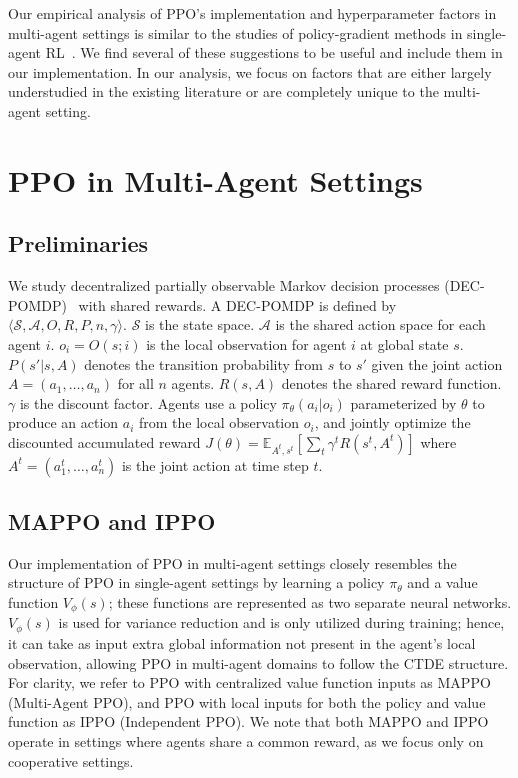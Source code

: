 \documentclass{article}
\theoremstyle{plain}
\theoremstyle{definition}
\theoremstyle{remark}
\begin{document}
Our empirical analysis of PPO's implementation and hyperparameter factors in multi-agent settings is similar to the studies of policy-gradient methods in single-agent RL~\cite{tucker2018mirage, Ilyas2020A, Engstrom2020Implementation, andrychowicz2021what}. We find several of these suggestions to be useful and include them in our implementation. In our analysis, we focus on factors that are either largely understudied in the existing literature or are completely unique to the multi-agent setting. 


 \section{PPO in Multi-Agent Settings} 
 \vspace{-2mm}
\subsection{Preliminaries}
We study decentralized partially observable Markov decision processes (DEC-POMDP)~\cite{oliehoek2016concise} with shared rewards. A DEC-POMDP is defined by $\langle \mathcal{S}, \mathcal{A}, O, R, P, n, \gamma \rangle$. $\mathcal{S}$ is the state space. $\mathcal{A}$ is the shared action space for  each agent $i$. $o_i=O(s;i)$ is the local observation for agent $i$ at global state $s$. $P(s'|s,A)$ denotes the transition probability from $s$ to $s'$ given the joint action $A=(a_1,\ldots,a_n)$ for all $n$ agents. $R(s,A)$ denotes the shared reward function. $\gamma$ is the discount factor.
Agents use a policy $\pi_{\theta}(a_i|o_i)$ parameterized by $\theta$ to produce an action $a_i$ from the local observation $o_i$, and 
jointly optimize the discounted accumulated reward $J(\theta)=\mathbb{E}_{A^t,s^t}\left[\sum_t \gamma^t R(s^t,A^t)\right]$ where $A^t=(a^t_1,\dots,a_n^t)$ is the joint action at time step $t$.

\subsection{MAPPO and IPPO} 

Our implementation of PPO in multi-agent settings closely resembles the structure of PPO in single-agent settings by learning a policy $\pi_{\theta}$ and a value function $V_{\phi}(s)$; these functions are represented as two separate neural networks. $V_{\phi}(s)$ is used for variance reduction and is only utilized during training; hence, it can take as input extra global information not present in the agent's local observation, allowing PPO in multi-agent domains to follow the CTDE structure. For clarity, we refer to PPO with centralized value function inputs as MAPPO (Multi-Agent PPO), and PPO with local inputs for both the policy and value function as IPPO (Independent PPO). We note that both MAPPO and IPPO operate in settings where agents share a common reward, as we focus only on cooperative settings. 
\end{document}
